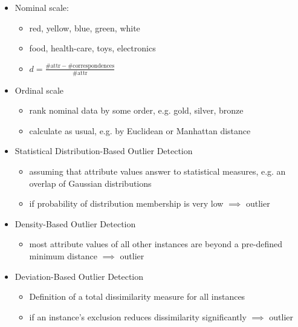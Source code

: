 \begin{breakbox}

\begin{itemize}
	\item Nominal scale:
		\begin{itemize}
			\item red, yellow, blue, green, white
			\item food, health-care, toys, electronics
			\item $d=\frac{\# \text{attr} - \# \text{correspondences}}{\# \text{attr}}$			
		\end{itemize}
	\item Ordinal scale
		\begin{itemize}
			\item rank nominal data by some order, e.g. gold, silver, bronze
			\item calculate as usual, e.g. by Euclidean or Manhattan distance
		\end{itemize}
\end{itemize}
\end{breakbox}



\begin{breakbox}

\begin{itemize}
	\item Statistical Distribution-Based Outlier Detection
		\begin{itemize}
			\item assuming that attribute values answer to statistical measures, e.g. an overlap of Gaussian distributions
			\item if probability of distribution membership is very low $\implies$ outlier		
		\end{itemize}
	\item Density-Based Outlier Detection
		\begin{itemize}
			\item most attribute values of all other instances are beyond a pre-defined minimum distance $\implies$ outlier
		\end{itemize}
	\item Deviation-Based Outlier Detection
		\begin{itemize}
			\item Definition of a total dissimilarity measure for all instances		
			\item if an instance's exclusion reduces dissimilarity significantly $\implies$ outlier
		\end{itemize}
\end{itemize}
\end{breakbox}



